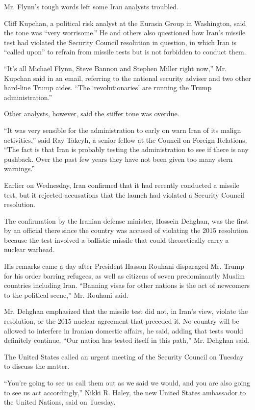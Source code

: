 Mr. Flynn's tough words left some Iran analysts troubled.

Cliff Kupchan, a political risk analyst at the Eurasia Group in
Washington, said the tone was ``very worrisome.'' He and others also
questioned how Iran's missile test had violated the Security Council
resolution in question, in which Iran is ``called upon'' to refrain from
missile tests but is not forbidden to conduct them.

``It's all Michael Flynn, Steve Bannon and Stephen Miller right now,''
Mr. Kupchan said in an email, referring to the national security adviser
and two other hard-line Trump aides. ``The `revolutionaries' are running
the Trump administration.''

Other analysts, however, said the stiffer tone was overdue.

``It was very sensible for the administration to early on warn Iran of
its malign activities,'' said Ray Takeyh, a senior fellow at the Council
on Foreign Relations. ``The fact is that Iran is probably testing the
administration to see if there is any pushback. Over the past few years
they have not been given too many stern warnings.''

Earlier on Wednesday, Iran confirmed that it had recently conducted a
missile test, but it rejected accusations that the launch had violated a
Security Council resolution.

The confirmation by the Iranian defense minister, Hossein Dehghan, was
the first by an official there since the country was accused of
violating the 2015 resolution because the test involved a ballistic
missile that could theoretically carry a nuclear warhead.

His remarks came a day after President Hassan Rouhani disparaged Mr.
Trump for his order barring refugees, as well as citizens of seven
predominantly Muslim countries including Iran. ``Banning visas for other
nations is the act of newcomers to the political scene,'' Mr. Rouhani
said.

Mr. Dehghan emphasized that the missile test did not, in Iran's view,
violate the resolution, or the 2015 nuclear agreement that preceded it.
No country will be allowed to interfere in Iranian domestic affairs, he
said, adding that tests would definitely continue. ``Our nation has
tested itself in this path,'' Mr. Dehghan said.

The United States called an urgent meeting of the Security Council on
Tuesday to discuss the matter.

``You're going to see us call them out as we said we would, and you are
also going to see us act accordingly,'' Nikki R. Haley, the new United
States ambassador to the United Nations, said on Tuesday.

